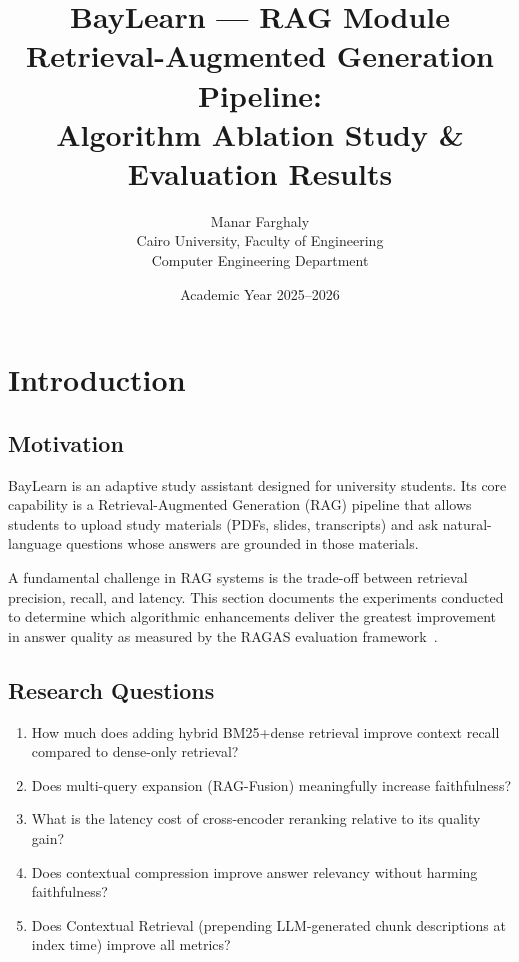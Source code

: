 \documentclass[12pt,a4paper]{article}
\title{%
  \textbf{BayLearn — RAG Module}\\[6pt]
  \large Retrieval-Augmented Generation Pipeline:\\
  Algorithm Ablation Study \& Evaluation Results
}
\author{Manar Farghaly \\ Cairo University, Faculty of Engineering \\ Computer Engineering Department}
\date{Academic Year 2025--2026}
\begin{document}
\maketitle
\tableofcontents
\newpage

\section{Introduction}

\subsection{Motivation}
BayLearn is an adaptive study assistant designed for university students. Its core capability is a Retrieval-Augmented Generation (RAG) pipeline that allows students to upload study materials (PDFs, slides, transcripts) and ask natural-language questions whose answers are grounded in those materials.

A fundamental challenge in RAG systems is the trade-off between retrieval precision, recall, and latency. This section documents the experiments conducted to determine which algorithmic enhancements deliver the greatest improvement in answer quality as measured by the RAGAS evaluation framework~\cite{es2023ragas}.

\subsection{Research Questions}
\begin{enumerate}
  \item How much does adding hybrid BM25+dense retrieval improve context recall compared to dense-only retrieval?
  \item Does multi-query expansion (RAG-Fusion) meaningfully increase faithfulness?
  \item What is the latency cost of cross-encoder reranking relative to its quality gain?
  \item Does contextual compression improve answer relevancy without harming faithfulness?
  \item Does Contextual Retrieval (prepending LLM-generated chunk descriptions at index time) improve all metrics?
\end{enumerate}

\end{document}
